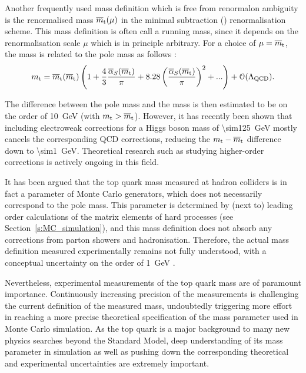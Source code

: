 Another frequently used mass definition which is free from renormalon ambiguity is the renormalised mass $\overline{m}_\mathrm{t}(\mu)$
in the minimal subtraction (\MS) renormalisation scheme. This mass definition is often call a running mass, since it
depends on the renormalisation scale $\mu$ which is in principle arbitrary. For a choice of $\mu=\overline{m}_\mathrm{t}$, the \MS mass
\MSmtop is related to the pole mass \mtop as follows
\autocite{top_pole_mass}:
\begin{equation}
m_\mathrm{t} = \overline{m}_\mathrm{t}(\overline{m}_\mathrm{t}) \left( 1 + \frac{4}{3} \frac{\overline{\alpha}_S(\overline{m}_\mathrm{t})}{\pi} + 8.28
\left(\frac{\overline{\alpha}_S(\overline{m}_\mathrm{t})}{\pi} \right)^2 + ... \right) + \mathcal{O}(\Lambda_\textrm{QCD}).
\end{equation}

The difference between the pole mass and the \MS mass is then estimated to be on the order of \SI{10}{\GeV} (with $m_\mathrm{t}
> \overline{m}_\mathrm{t}$). However, it has recently been shown \autocite{pole_MS_top_difference} that including electroweak
corrections for a Higgs boson mass of \SI{\sim125}{\GeV} mostly cancels the corresponding QCD corrections, reducing the
$m_\mathrm{t}-\overline{m}_\mathrm{t}$ difference down to \SI{\sim1}{\GeV}. Theoretical research such as studying higher-order corrections is
actively ongoing in this field.

It has been argued that the top quark mass measured at hadron colliders is in fact a parameter of Monte Carlo
generators, which does not necessarily correspond to the pole mass. This parameter is determined by (next to) leading
order calculations of the matrix elements of hard processes (see Section~\ref{s:MC_simulation}), and this mass
definition does not absorb any corrections from parton showers and hadronisation. Therefore, the actual mass definition
measured experimentally remains not fully understood, with a conceptual uncertainty on the order of
\SI{1}{\GeV} \autocite{measured_top_mass_interpretation}.

Nevertheless, experimental measurements of the top quark mass are of paramount importance. Continuously increasing
precision of the measurements is challenging the current definition of the measured mass, undoubtedly triggering more
effort in reaching a more precise theoretical specification of the mass parameter used in Monte Carlo simulation. As the
top quark is a major background to many new physics searches beyond the Standard Model, deep understanding of its mass
parameter in simulation as well as pushing down the corresponding theoretical and experimental uncertainties are
extremely important.

